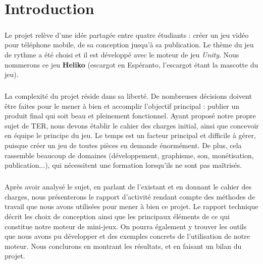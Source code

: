 \chapter{Introduction}

\paragraph{}
Le projet relève d'une idée partagée entre quatre étudiants : créer un jeu vidéo pour téléphone mobile, de sa conception jusqu'à sa publication. Le thème du jeu de rythme a été choisi et il est développé avec le moteur de jeu \textit{Unity}. Nous nommerons ce jeu \textbf{Heliko} (escargot en Espéranto, l'escargot étant la mascotte du jeu).

\paragraph{}
La complexité du projet réside dans sa liberté. De nombreuses décisions doivent être faites pour le mener à bien et accomplir l'objectif principal : publier un produit final qui soit beau et pleinement fonctionnel. Ayant proposé notre propre sujet de TER, nous devons établir le cahier des charges initial, ainsi que concevoir en équipe le principe du jeu. Le temps est un facteur principal et difficile à gérer, puisque créer un jeu de toutes pièces en demande énormément. De plus, cela rassemble beaucoup de domaines (développement, graphisme, son, monétisation, publication...), qui nécessitent une formation lorsqu'ils ne sont pas maîtrisés.

\paragraph{}
Après avoir analysé le sujet, en parlant de l'existant et en donnant le cahier des charges, nous présenterons le rapport d'activité rendant compte des méthodes de travail que nous avons utilisées pour mener à bien ce projet. Le rapport technique décrit les choix de conception ainsi que les principaux éléments de ce qui constitue notre moteur de mini-jeux. On pourra également y trouver les outils que nous avons pu développer et des exemples concrets de l'utilisation de notre moteur. Nous conclurons en montrant les résultats, et en faisant un bilan du projet.
